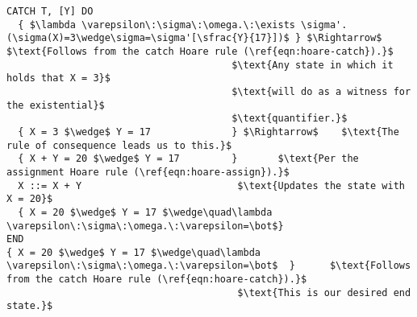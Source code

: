 \begin{lstlisting}[mathescape=true,keepspaces=true,label=lst:hoare_ex_asgn,caption=A small program demonstrating a try-catch statement.]
CATCH T, [Y] DO
  { $\lambda \varepsilon\:\sigma\:\omega.\:\exists \sigma'.(\sigma(X)=3\wedge\sigma=\sigma'[\sfrac{Y}{17}])$ } $\Rightarrow$    $\text{Follows from the catch Hoare rule (\ref{eqn:hoare-catch}).}$
                                       $\text{Any state in which it holds that X = 3}$
                                       $\text{will do as a witness for the existential}$
                                       $\text{quantifier.}$
  { X = 3 $\wedge$ Y = 17              } $\Rightarrow$    $\text{The rule of consequence leads us to this.}$
  { X + Y = 20 $\wedge$ Y = 17         }       $\text{Per the assignment Hoare rule (\ref{eqn:hoare-assign}).}$
  X ::= X + Y                           $\text{Updates the state with X = 20}$
  { X = 20 $\wedge$ Y = 17 $\wedge\quad\lambda \varepsilon\:\sigma\:\omega.\:\varepsilon=\bot$}
END
{ X = 20 $\wedge$ Y = 17 $\wedge\quad\lambda \varepsilon\:\sigma\:\omega.\:\varepsilon=\bot$  }      $\text{Follows from the catch Hoare rule (\ref{eqn:hoare-catch}).}$
                                        $\text{This is our desired end state.}$
\end{lstlisting}